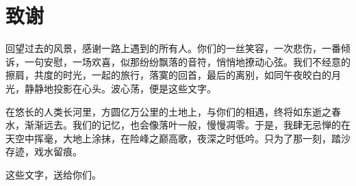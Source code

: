 \chapter{致谢}

回望过去的风景，感谢一路上遇到的所有人。你们的一丝笑容，一次悲伤，一番倾诉，一句安慰，一场欢喜，似那纷纷飘落的音符，悄悄地撩动心弦。我们不经意的擦肩，共度的时光，一起的旅行，落寞的回首，最后的离别，如同午夜皎白的月光，静静地投影在心头。波心荡，便是这些文字。

在悠长的人类长河里，方圆亿万公里的土地上，与你们的相遇，终将如东逝之春水，渐渐远去。我们的记忆，也会像落叶一般，慢慢凋零。于是，我肆无忌惮的在天空中挥毫，大地上涂抹，在险峰之巅高歌，夜深之时低吟。只为了那一刻，踏沙存迹，戏水留痕。

这些文字，送给你们。
